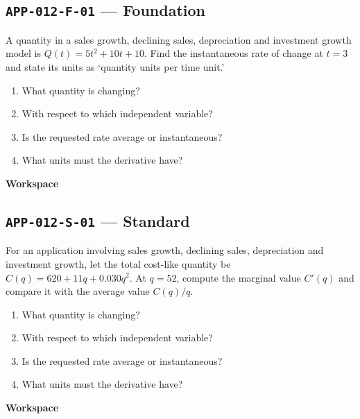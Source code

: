 \documentclass[11pt]{book}
\newcommand{\pid}[1]{\texttt{#1}}
\newcommand{\workspace}{\par\vspace{0.7in}\hrulefill\par\vspace{0.55in}\hrulefill\par}
\begin{document}
\subsection*{\pid{APP-012-F-01} — Foundation}
\begin{problembox}
A quantity in a sales growth, declining sales, depreciation and investment growth model is $Q(t)=5t^2+10t+10$. Find the instantaneous rate of change at $t=3$ and state its units as ‘quantity units per time unit.’
\end{problembox}
\begin{promptbox}\begin{enumerate}
\item What quantity is changing?
\item With respect to which independent variable?
\item Is the requested rate average or instantaneous?
\item What units must the derivative have?
\end{enumerate}\end{promptbox}
\textbf{Workspace}\workspace
{}
\subsection*{\pid{APP-012-S-01} — Standard}
\begin{problembox}
For an application involving sales growth, declining sales, depreciation and investment growth, let the total cost-like quantity be $C(q)=620+11q+0.030q^2$. At $q=52$, compute the marginal value $C'(q)$ and compare it with the average value $C(q)/q$.
\end{problembox}
\begin{promptbox}\begin{enumerate}
\item What quantity is changing?
\item With respect to which independent variable?
\item Is the requested rate average or instantaneous?
\item What units must the derivative have?
\end{enumerate}\end{promptbox}
\textbf{Workspace}\workspace
{}
\end{document}
